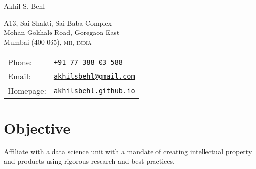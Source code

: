 \documentclass[a4paper,10pt]{article}
\def\name{Akhil S. Behl}
\newcommand{\abbrv}[1]{\textsc{#1}}
\begin{document}
{\huge \name}


\vspace{0.25in}

\begin{minipage}{0.45\linewidth}
  A13, Sai Shakti, Sai Baba Complex \\
  Mohan Gokhale Road, Goregaon East \\
  Mumbai (400 065), \abbrv{mh, india} \\
\end{minipage}
\hspace*{0.8in}
\begin{minipage}{0.45\linewidth}
  \vspace*{-\baselineskip}
  \begin{tabular}{ll}
    Phone: & \tt +91 77 388 03 588 \\
    Email: & \href{mailto:akhilsbehl@gmail.com}{\tt akhilsbehl@gmail.com} \\
    Homepage: & \href{http://akhilsbehl.github.io}{\tt akhilsbehl.github.io} \\
  \end{tabular}
\end{minipage}

\section*{Objective}
Affiliate with a data science unit with a mandate of creating intellectual
property and products using rigorous research and best practices.
\end{document}
